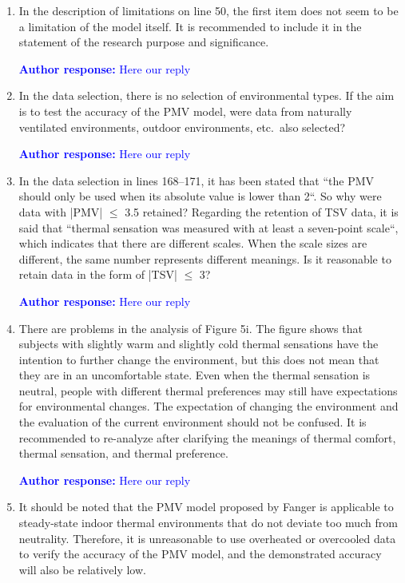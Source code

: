 \documentclass[a4paper, 10pt]{letter}
\newcommand{\response}[1]{\textcolor{blue}{\textbf{Author response:} #1}}
\begin{document}
\begin{letter}
\begin{enumerate}
            \response{Here our reply}

            \item In the description of limitations on line 50, the first item does not seem to be a limitation of the model itself.
            It is recommended to include it in the statement of the research purpose and significance.

            \response{Here our reply}

            \item In the data selection, there is no selection of environmental types.
            If the aim is to test the accuracy of the PMV model, were data from naturally ventilated environments, outdoor environments, etc.\ also selected?

            \response{Here our reply}

            \item In the data selection in lines 168--171, it has been stated that ``the PMV should only be used when its absolute value is lower than 2``.
            So why were data with |PMV| $\leq$ 3.5 retained?
            Regarding the retention of TSV data, it is said that ``thermal sensation was measured with at least a seven-point scale``, which indicates that there are different scales.
            When the scale sizes are different, the same number represents different meanings.
            Is it reasonable to retain data in the form of |TSV| $\leq$ 3?

            \response{Here our reply}

            \item There are problems in the analysis of Figure 5i.
            The figure shows that subjects with slightly warm and slightly cold thermal sensations have the intention to further change the environment, but this does not mean that they are in an uncomfortable state.
            Even when the thermal sensation is neutral, people with different thermal preferences may still have expectations for environmental changes.
            The expectation of changing the environment and the evaluation of the current environment should not be confused.
            It is recommended to re-analyze after clarifying the meanings of thermal comfort, thermal sensation, and thermal preference.

            \response{Here our reply}

            \item It should be noted that the PMV model proposed by Fanger is applicable to steady-state indoor thermal environments that do not deviate too much from neutrality.
            Therefore, it is unreasonable to use overheated or overcooled data to verify the accuracy of the PMV model, and the demonstrated accuracy will also be relatively low.


\end{enumerate}
\end{letter}
\end{document}
